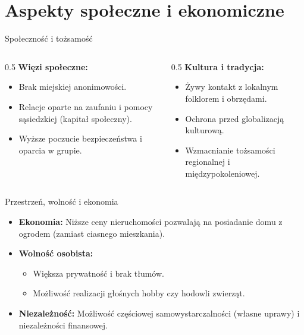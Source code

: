 \section{Aspekty społeczne i ekonomiczne}

\begin{frame}{Społeczność i tożsamość}
    \begin{columns}
        \begin{column}{0.5\textwidth}
            \textbf{Więzi społeczne:}
            \begin{itemize}
                \item Brak miejskiej anonimowości.
                \item Relacje oparte na zaufaniu i pomocy sąsiedzkiej (kapitał społeczny).
                \item Wyższe poczucie bezpieczeństwa i oparcia w grupie.
            \end{itemize}
        \end{column}
        
        \begin{column}{0.5\textwidth}
            \textbf{Kultura i tradycja:}
            \begin{itemize}
                \item Żywy kontakt z lokalnym folklorem i obrzędami.
                \item Ochrona przed globalizacją kulturową.
                \item Wzmacnianie tożsamości regionalnej i międzypokoleniowej.
            \end{itemize}
        \end{column}
    \end{columns}
\end{frame}

\begin{frame}{Przestrzeń, wolność i ekonomia}
    \begin{itemize}
        \item \textbf{Ekonomia:} Niższe ceny nieruchomości pozwalają na posiadanie domu z ogrodem (zamiast ciasnego mieszkania).
        \item \textbf{Wolność osobista:} 
        \begin{itemize}
            \item Większa prywatność i brak tłumów.
            \item Możliwość realizacji głośnych hobby czy hodowli zwierząt.
        \end{itemize}
        \item \textbf{Niezależność:} Możliwość częściowej samowystarczalności (własne uprawy) i niezależności finansowej.
    \end{itemize}
\end{frame}

